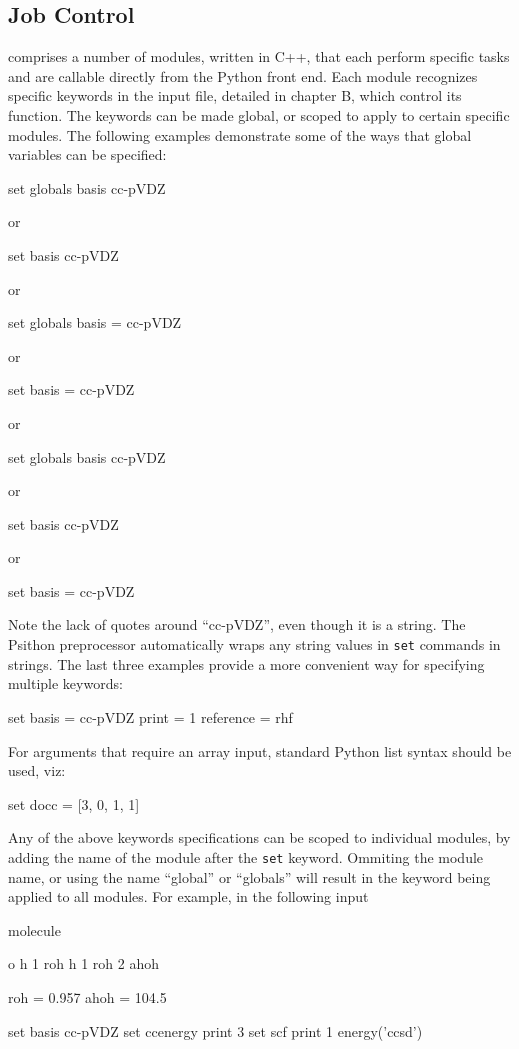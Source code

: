 \subsection{Job Control}
\PSIfour comprises a number of modules, written in C++, that each perform
specific tasks and are callable directly from the Python front end. Each module
recognizes specific keywords in the input file, detailed in chapter B, which
control its function. The keywords can be made global, or scoped to apply to
certain specific modules. The following examples demonstrate some of the ways
that global variables can be specified:
\begin{Snippet}
set globals basis cc-pVDZ

 or

set basis cc-pVDZ

 or

set globals basis = cc-pVDZ

 or

set basis = cc-pVDZ

 or

set globals{
  basis cc-pVDZ
}

 or

set{
  basis cc-pVDZ
}

 or

set{
  basis = cc-pVDZ
}
\end{Snippet}
Note the lack of quotes around ``cc-pVDZ'', even though it is a string. The
Psithon preprocessor automatically wraps any string values in {\tt set} commands in
strings. The last three examples provide a more convenient way for specifying
multiple keywords:
\begin{Snippet}
set{
  basis = cc-pVDZ
  print = 1
  reference = rhf
}
\end{Snippet}
For arguments that require an array input, standard Python list syntax should
be used, viz:
\begin{Snippet}
set{
  docc = [3, 0, 1, 1]
}
\end{Snippet}
Any of the above keywords specifications can be scoped to individual modules,
by adding the name of the module after the {\tt set} keyword. Ommiting the module
name, or using the name ``global'' or ``globals'' will result in the keyword being
applied to all modules. For example, in the following input
\begin{Snippet}
molecule{
  o
  h 1 roh
  h 1 roh 2 ahoh

  roh = 0.957
  ahoh = 104.5
}

set basis cc-pVDZ
set ccenergy print 3
set scf print 1
energy('ccsd')
\end{Snippet}
